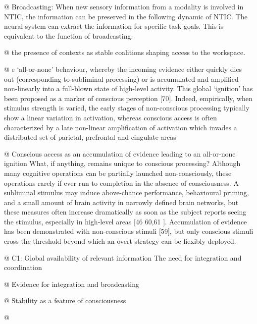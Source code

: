 \documentclass[utf8]{article}
\begin{document}
		\begin{WritingMaterials}
			
			
			@ Broadcasting: When new sensory information from a modality is involved in NTIC, the information can be preserved in the following dynamic of NTIC. The neural system can extract the information for specific task goals. This is equivalent to the function of broadcasting. 
		
			@ the presence of contexts as stable coalitions shaping access to the workspace.

			@ e ‘all-or-none’ behaviour, whereby the incoming evidence either quickly dies out (corresponding to subliminal processing) or is accumulated and amplified non-linearly into a full-blown state of high-level activity. This global ‘ignition’ has been proposed as a marker of conscious perception [70]. Indeed, empirically, when stimulus strength is varied, the early stages of non-conscious processing typically show a linear variation in activation, whereas conscious access is often characterized by a late non-linear amplification of activation which invades a distributed set of parietal, prefrontal and cingulate areas

			@ Conscious access as an accumulation of evidence leading to an all-or-none ignition What, if anything, remains unique to conscious processing? Although many cognitive operations can be partially launched non-consciously, these operations rarely if ever run to completion in the absence of consciousness. A subliminal stimulus may induce above-chance performance, behavioural priming, and a small amount of brain activity in narrowly defined brain networks, but these measures often increase dramatically as soon as the subject reports seeing the stimulus, especially in high-level areas [46 60,61  ]. Accumulation of evidence has been demonstrated with non-conscious stimuli [59], but only conscious stimuli cross the threshold beyond which an overt strategy can be fiexibly deployed. 

			@ C1: Global availability of relevant information The need for integration and coordination \cite{Dehaene2017}

			@ Evidence for integration and broadcasting

			@ Stability as a feature of consciousness 

			@ 


\end{WritingMaterials}
\end{document}
